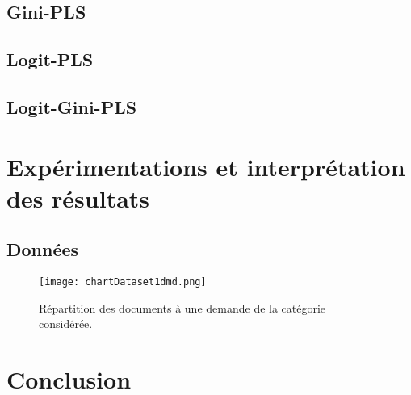\subsection{Gini-PLS}
\subsection{Logit-PLS}
\subsection{Logit-Gini-PLS}

\section{Expérimentations et interprétation des résultats}
\label{sec:sensresultat:experimentations}

\subsection{Données}
\label{subsec:sensresultat:xp:data}

\begin{figure}
\texttt{[image: chartDataset1dmd.png]}
\caption{Répartition des documents à une demande de la catégorie considérée.}\label{stat-1dmd}
\end{figure}

\section{Conclusion}
\label{sec:sensresultat:conclusion}